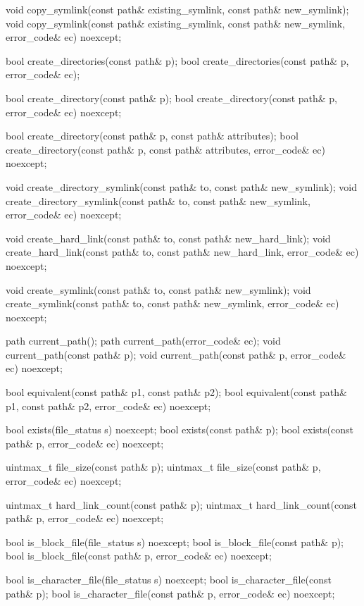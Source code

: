 \begin{codeblock}
{  void copy_symlink(const path& existing_symlink, const path& new_symlink);
  void copy_symlink(const path& existing_symlink, const path& new_symlink,
                    error_code& ec) noexcept;

  bool create_directories(const path& p);
  bool create_directories(const path& p, error_code& ec);

  bool create_directory(const path& p);
  bool create_directory(const path& p, error_code& ec) noexcept;

  bool create_directory(const path& p, const path& attributes);
  bool create_directory(const path& p, const path& attributes,
                        error_code& ec) noexcept;

  void create_directory_symlink(const path& to, const path& new_symlink);
  void create_directory_symlink(const path& to, const path& new_symlink,
                                error_code& ec) noexcept;

  void create_hard_link(const path& to, const path& new_hard_link);
  void create_hard_link(const path& to, const path& new_hard_link,
                        error_code& ec) noexcept;

  void create_symlink(const path& to, const path& new_symlink);
  void create_symlink(const path& to, const path& new_symlink,
                      error_code& ec) noexcept;

  path current_path();
  path current_path(error_code& ec);
  void current_path(const path& p);
  void current_path(const path& p, error_code& ec) noexcept;

  bool equivalent(const path& p1, const path& p2);
  bool equivalent(const path& p1, const path& p2, error_code& ec) noexcept;

  bool exists(file_status s) noexcept;
  bool exists(const path& p);
  bool exists(const path& p, error_code& ec) noexcept;

  uintmax_t file_size(const path& p);
  uintmax_t file_size(const path& p, error_code& ec) noexcept;

  uintmax_t hard_link_count(const path& p);
  uintmax_t hard_link_count(const path& p, error_code& ec) noexcept;

  bool is_block_file(file_status s) noexcept;
  bool is_block_file(const path& p);
  bool is_block_file(const path& p, error_code& ec) noexcept;

  bool is_character_file(file_status s) noexcept;
  bool is_character_file(const path& p);
  bool is_character_file(const path& p, error_code& ec) noexcept;

}
\end{codeblock}
